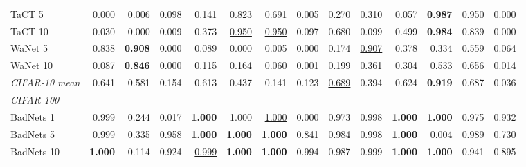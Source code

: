 \begin{table}[htbp]
\begin{adjustbox}{max width=\textwidth}
\begin{tabular}{lrrrrrrrrrrrrr}
TaCT 5 & \textcolor{black!45}{0.000} & \textcolor{black!45}{0.006} & \textcolor{black!45}{0.098} & \textcolor{black!45}{0.141} & 0.823 & 0.691 & \textcolor{black!45}{0.005} & \textcolor{black!45}{0.270} & \textcolor{black!45}{0.310} & \textcolor{black!45}{0.057} & \textbf{0.987} & \underline{0.950} & \textcolor{black!45}{0.000} \\
TaCT 10 & \textcolor{black!45}{0.030} & \textcolor{black!45}{0.000} & \textcolor{black!45}{0.009} & \textcolor{black!45}{0.373} & \underline{0.950} & \underline{0.950} & \textcolor{black!45}{0.097} & 0.680 & \textcolor{black!45}{0.099} & \textcolor{black!45}{0.499} & \textbf{0.984} & 0.839 & \textcolor{black!45}{0.000} \\
WaNet 5 & 0.838 & \textbf{0.908} & \textcolor{black!45}{0.000} & \textcolor{black!45}{0.089} & \textcolor{black!45}{0.000} & \textcolor{black!45}{0.005} & \textcolor{black!45}{0.000} & \textcolor{black!45}{0.174} & \underline{0.907} & \textcolor{black!45}{0.378} & \textcolor{black!45}{0.334} & 0.559 & \textcolor{black!45}{0.064} \\
WaNet 10 & \textcolor{black!45}{0.087} & \textbf{0.846} & \textcolor{black!45}{0.000} & \textcolor{black!45}{0.115} & \textcolor{black!45}{0.164} & \textcolor{black!45}{0.060} & \textcolor{black!45}{0.001} & \textcolor{black!45}{0.199} & \textcolor{black!45}{0.361} & \textcolor{black!45}{0.304} & 0.533 & \underline{0.656} & \textcolor{black!45}{0.014} \\
\rowcolor{black!8}\emph{CIFAR-10 mean} & 0.641 & 0.581 & \textcolor{black!45}{0.154} & 0.613 & \textcolor{black!45}{0.437} & \textcolor{black!45}{0.141} & \textcolor{black!45}{0.123} & \underline{0.689} & \textcolor{black!45}{0.394} & 0.624 & \textbf{0.919} & 0.687 & \textcolor{black!45}{0.036} \\
\multicolumn{14}{l}{\emph{CIFAR-100}} \\
BadNets 1 & 0.999 & \textcolor{black!45}{0.244} & \textcolor{black!45}{0.017} & \textbf{1.000} & 1.000 & \underline{1.000} & \textcolor{black!45}{0.000} & 0.973 & 0.998 & \textbf{1.000} & \textbf{1.000} & 0.975 & 0.932 \\
BadNets 5 & \underline{0.999} & \textcolor{black!45}{0.335} & 0.958 & \textbf{1.000} & \textbf{1.000} & \textbf{1.000} & 0.841 & 0.984 & 0.998 & \textbf{1.000} & \textcolor{black!45}{0.004} & 0.989 & 0.730 \\
BadNets 10 & \textbf{1.000} & \textcolor{black!45}{0.114} & 0.924 & \underline{0.999} & \textbf{1.000} & \textbf{1.000} & 0.994 & 0.987 & 0.999 & \textbf{1.000} & \textbf{1.000} & 0.941 & 0.895 \\

\end{tabular}
\end{adjustbox}
\end{table}
